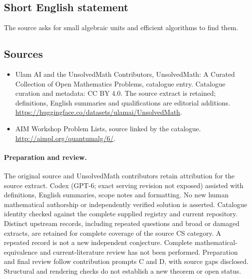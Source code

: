 \documentclass[11pt]{article}
\begin{document}
\subsection{Short English statement}
The source asks for small algebraic units and efficient algorithms to find them.
\subsection{Sources}
\begin{itemize}
\item[\hypertarget{source:statement:1}{S1}] Ulam AI and the UnsolvedMath Contributors, UnsolvedMath: A Curated Collection of Open Mathematics Problems, catalogue entry. Catalogue curation and metadata: CC BY 4.0. The source extract is retained; definitions, English summaries and qualifications are editorial additions.
\url{https://huggingface.co/datasets/ulamai/UnsolvedMath}.
\item[\hypertarget{source:statement:2}{S2}] AIM Workshop Problem Lists, source linked by the catalogue.
\url{http://aimpl.org/quantumalg/6/}.
\end{itemize}
\paragraph{Preparation and review.}
The original source and UnsolvedMath contributors retain attribution for the source extract. Codex (GPT-6; exact serving revision not exposed) assisted with definitions, English summaries, scope notes and formatting. No new human mathematical authorship or independently verified solution is asserted. Catalogue identity checked against the complete supplied registry and current repository. Distinct upstream records, including repeated questions and broad or damaged extracts, are retained for complete coverage of the source CS category. A repeated record is not a new independent conjecture. Complete mathematical-equivalence and current-literature review has not been performed. Preparation and final review follow contribution prompts C and D, with source gaps disclosed. Structural and rendering checks do not establish a new theorem or open status.
\label{end:statement}
\end{document}
